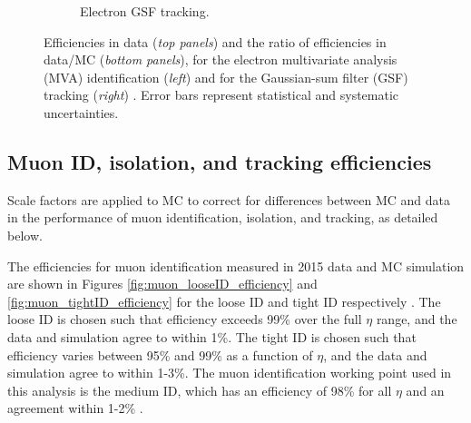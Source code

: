 \begin{figure}[h]
\begin{subfigure}{0.45\textwidth}
        \caption{Electron GSF tracking.}
        \label{fig:electron_GSF_tracking_efficiency}
    \end{subfigure}
    \caption[Efficiencies in data (\textit{top panels}) and the ratio of efficiencies in data/MC (\textit{bottom panels}), for the electron multivariate analysis (MVA) identification (\textit{left}) and for the Gaussian-sum filter (GSF) tracking (\textit{right}).]{Efficiencies in data (\textit{top panels}) and the ratio of efficiencies in data/MC (\textit{bottom panels}), for the electron multivariate analysis (MVA) identification (\textit{left}) and for the Gaussian-sum filter (GSF) tracking (\textit{right}) \cite{CMS-DP-2020-037}. Error bars represent statistical and systematic uncertainties.} 
\end{figure}


\subsection{Muon ID, isolation, and tracking efficiencies}
Scale factors are applied to MC to correct for differences between MC and data in the performance of muon identification, isolation, and tracking, as detailed below.

The efficiencies for muon identification measured in 2015 data and MC simulation are shown in Figures \ref{fig:muon_looseID_efficiency} and \ref{fig:muon_tightID_efficiency} for the loose ID and tight ID respectively \cite{CMS-MUO-16-001}. The loose ID is chosen such that efficiency exceeds 99\% over the full $\eta$ range, and the data and simulation agree to within 1\%. The tight ID is chosen such that efficiency varies between 95\% and 99\% as a function of $\eta$, and the data and simulation agree to within 1-3\%. The muon identification working point used in this analysis is the medium ID, which has an efficiency of 98\% for all $\eta$ and an agreement within 1-2\% \cite{CMS-MUO-16-001}. 

